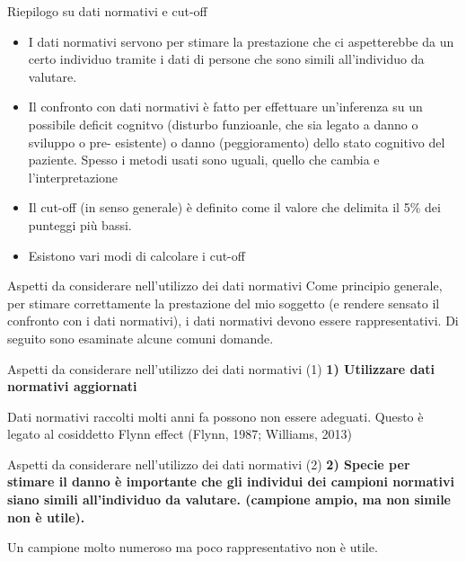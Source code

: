 \documentclass[
  ignorenonframetext,
]{beamer}
\begin{document}
\begin{frame}{Riepilogo su dati normativi e cut-off}
\label{riepilogo-su-dati-normativi-e-cut-off}
\small

\begin{itemize}
\item
  I dati normativi servono per stimare la prestazione che ci
  aspetterebbe da un certo individuo tramite i dati di persone che sono
  simili all'individuo da valutare.
\item
  Il confronto con dati normativi è fatto per effettuare un'inferenza su
  un possibile deficit cognitvo (disturbo funzioanle, che sia legato a
  danno o sviluppo o pre- esistente) o danno (peggioramento) dello stato
  cognitivo del paziente. Spesso i metodi usati sono uguali, quello che
  cambia e l'interpretazione
\item
  Il cut-off (in senso generale) è definito come il valore che delimita
  il 5\% dei punteggi più bassi.
\item
  Esistono vari modi di calcolare i cut-off
\end{itemize}
\end{frame}

\begin{frame}{Aspetti da considerare nell'utilizzo dei dati normativi}
\label{aspetti-da-considerare-nellutilizzo-dei-dati-normativi}
Come principio generale, per stimare correttamente la prestazione del
mio soggetto (e rendere sensato il confronto con i dati normativi), i
dati normativi devono essere rappresentativi. Di seguito sono esaminate
alcune comuni domande.
\end{frame}

\begin{frame}{Aspetti da considerare nell'utilizzo dei dati normativi
(1)}
\label{aspetti-da-considerare-nellutilizzo-dei-dati-normativi-1}
\textbf{1) Utilizzare dati normativi aggiornati} \vspace{2em}

Dati normativi raccolti molti anni fa possono non essere adeguati.
Questo è legato al cosiddetto Flynn effect (Flynn, 1987; Williams, 2013)
\end{frame}

\begin{frame}{Aspetti da considerare nell'utilizzo dei dati normativi
(2)}
\label{aspetti-da-considerare-nellutilizzo-dei-dati-normativi-2}
\textbf{2) Specie per stimare il danno è importante che gli individui
dei campioni normativi siano simili all'individuo da valutare. (campione
ampio, ma non simile non è utile).} \vspace{2em}

Un campione molto numeroso ma poco rappresentativo non è utile.
\end{frame}
\end{document}
